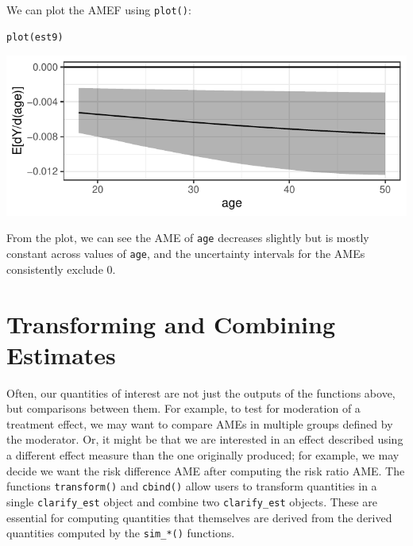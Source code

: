 We can plot the AMEF using \texttt{plot()}:
\begin{verbatim}
plot(est9)
\end{verbatim}
\begin{center}\includegraphics{figures/plot9-1} \end{center}
From the plot, we can see the AME of \texttt{age} decreases slightly but is mostly constant across values of \texttt{age}, and the uncertainty intervals for the AMEs consistently exclude 0.
\section{Transforming and Combining Estimates}\label{transforming-and-combining-estimates}
Often, our quantities of interest are not just the outputs of the functions above, but comparisons between them. For example, to test for moderation of a treatment effect, we may want to compare AMEs in multiple groups defined by the moderator. Or, it might be that we are interested in an effect described using a different effect measure than the one originally produced; for example, we may decide we want the risk difference AME after computing the risk ratio AME. The functions \texttt{transform()} and \texttt{cbind()} allow users to transform quantities in a single \texttt{clarify\_est} object and combine two \texttt{clarify\_est} objects. These are essential for computing quantities that themselves are derived from the derived quantities computed by the \texttt{sim\_*()} functions.
